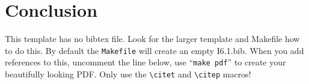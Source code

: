 \documentclass[11pt,twoside]{article}
\begin{document}
\section{Conclusion}

This template has no bibtex file.  Look for the larger template and
Makefile how to do this. By default the {\tt Makefile} will create an
empty I6.1.bib. When you add references to this, uncomment the
line \verb++ below, use ``{\tt make pdf}'' to create
your beautifully looking PDF. Only use the
\verb"\citet" and \verb"\citep" macros!





\end{document}

